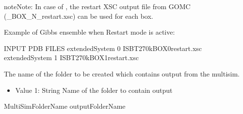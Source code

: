 \documentclass[letterpaper,10pt,english]{sphinxmanual}
\begin{document}
\begin{description}
\begin{sphinxadmonition}{note}{Note:}
\sphinxAtStartPar
In case of , the restart XSC output file from GOMC (\_BOX\_N\_restart.xsc) can be used for each box.
\end{sphinxadmonition}

\sphinxAtStartPar
Example of Gibbs ensemble when Restart mode is active:

\begin{sphinxVerbatim}[commandchars=\\\{\}]
\PYGZsh{}\PYGZsh{}\PYGZsh{}\PYGZsh{}\PYGZsh{}\PYGZsh{}\PYGZsh{}\PYGZsh{}\PYGZsh{}\PYGZsh{}\PYGZsh{}\PYGZsh{}\PYGZsh{}\PYGZsh{}\PYGZsh{}\PYGZsh{}\PYGZsh{}\PYGZsh{}\PYGZsh{}\PYGZsh{}\PYGZsh{}\PYGZsh{}\PYGZsh{}\PYGZsh{}\PYGZsh{}\PYGZsh{}\PYGZsh{}\PYGZsh{}\PYGZsh{}\PYGZsh{}\PYGZsh{}\PYGZsh{}\PYGZsh{}
\PYGZsh{} INPUT PDB FILES
\PYGZsh{}\PYGZsh{}\PYGZsh{}\PYGZsh{}\PYGZsh{}\PYGZsh{}\PYGZsh{}\PYGZsh{}\PYGZsh{}\PYGZsh{}\PYGZsh{}\PYGZsh{}\PYGZsh{}\PYGZsh{}\PYGZsh{}\PYGZsh{}\PYGZsh{}\PYGZsh{}\PYGZsh{}\PYGZsh{}\PYGZsh{}\PYGZsh{}\PYGZsh{}\PYGZsh{}\PYGZsh{}\PYGZsh{}\PYGZsh{}\PYGZsh{}\PYGZsh{}\PYGZsh{}\PYGZsh{}\PYGZsh{}\PYGZsh{}
extendedSystem   0   ISB\PYGZus{}T\PYGZus{}270\PYGZus{}k\PYGZus{}BOX\PYGZus{}0\PYGZus{}restart.xsc
extendedSystem   1   ISB\PYGZus{}T\PYGZus{}270\PYGZus{}k\PYGZus{}BOX\PYGZus{}1\PYGZus{}restart.xsc
\end{sphinxVerbatim}

\item[{\sphinxcode{\sphinxupquote{MultiSimFolderName}}}] \leavevmode
\sphinxAtStartPar
The name of the folder to be created which contains output from the multisim.
\begin{itemize}
\item {} 
\sphinxAtStartPar
Value 1: String \sphinxhyphen{} Name of the folder to contain output

\end{itemize}

\begin{sphinxVerbatim}[commandchars=\\\{\}]
MultiSimFolderName  outputFolderName
\end{sphinxVerbatim}

\end{description}
\end{document}
